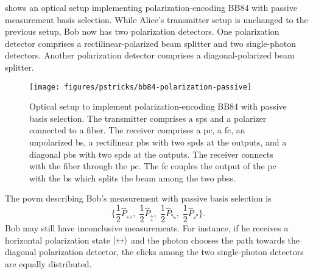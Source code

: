  shows an optical setup implementing polarization-encoding BB84 with passive measurement basis selection.
While Alice's transmitter setup is unchanged to the previous setup, Bob now has two polarization detectors.
One polarization detector comprises a rectilinear-polarized beam splitter and two single-photon detectors.
Another polarization detector comprises a diagonal-polarized beam splitter.
\begin{figure}[htb]
	\centering
	\texttt{[image: figures/pstricks/bb84-polarization-passive]}
	\caption{Optical setup to implement polarization-encoding BB84 with passive basis selection. The transmitter comprises a \gls{sps} and a polarizer connected to a fiber. The receiver comprises a \gls{pc}, a \gls{fc}, an unpolarized \gls{bs}, a rectilinear \gls{pbs} with two \gls{spd}s at the outputs, and a diagonal \gls{pbs} with two \gls{spd}s at the outputs. The receiver connects with the fiber through the \gls{pc}. The \gls{fc} couples the output of the \gls{pc} with the \gls{bs} which splits the beam among the two \gls{pbs}s.}\label{fig:polarization_encoding_passive}
\end{figure}
The \gls{povm} describing Bob's measurement with passive basis selection is
\begin{equation}
	\biggl\{
		\frac{1}{2}\hat{P}_{\leftrightarrow},
		\;
		\frac{1}{2}\hat{P}_{\updownarrow},
		\;
		\frac{1}{2}\hat{P}_{\nwsearrow},
		\;
		\frac{1}{2}\hat{P}_{\neswarrow}
	\biggr\}
	.
\end{equation}
Bob may still have inconclusive measurements.
For instance, if he receives a horizontal polarization state $\lvert\leftrightarrow\rangle$ and the photon chooses the path towards the diagonal polarization detector, the clicks among the two single-photon detectors are equally distributed.
